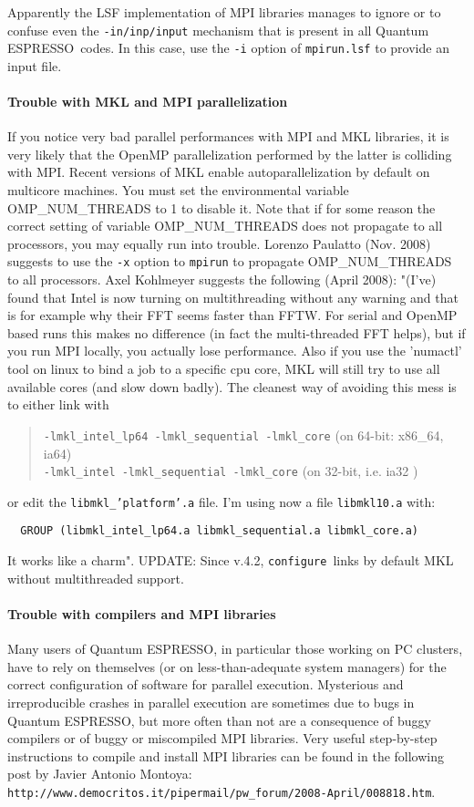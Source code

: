 \documentclass[12pt,a4paper]{article}
\def\qe{{\sc Quantum ESPRESSO}}
\def\configure{\texttt{configure}}
\begin{document}
Apparently the LSF implementation of MPI libraries manages to ignore or to
confuse even the \texttt{-in/inp/input} mechanism that is present in all
\qe\ codes. In this case, use the \texttt{-i} option of \texttt{mpirun.lsf}
to provide an input file.

\paragraph{Trouble with MKL and MPI parallelization}
If you notice very bad parallel performances with MPI and MKL libraries, 
it is very likely that the OpenMP parallelization performed by the latter 
is colliding with MPI. Recent versions of MKL enable autoparallelization
by default on multicore machines.  You must set the environmental variable
OMP\_NUM\_THREADS to 1 to disable it. 
Note that if for some reason the correct setting  of variable
OMP\_NUM\_THREADS  
does not propagate to all processors, you may equally run into trouble. 
Lorenzo Paulatto (Nov. 2008) suggests to use the \texttt{-x} option to \texttt{mpirun} to 
propagate OMP\_NUM\_THREADS to all processors.
Axel Kohlmeyer suggests the following (April 2008): 
"(I've) found that Intel is now turning on multithreading without any
warning and that is for example why their FFT seems faster than
FFTW. For serial and OpenMP based runs this makes no difference (in
fact the multi-threaded FFT helps), but if you run MPI locally, you
actually lose performance. Also if you use the 'numactl' tool on linux
to bind a job to a specific cpu core, MKL will still try to use all
available cores (and slow down badly). The cleanest way of avoiding
this mess is to either link with
\begin{quote}
\texttt{-lmkl\_intel\_lp64 -lmkl\_sequential -lmkl\_core} (on 64-bit: 
x86\_64, ia64)\\
\texttt{-lmkl\_intel -lmkl\_sequential -lmkl\_core} (on 32-bit, i.e. ia32 )
\end{quote}
or edit the \texttt{libmkl\_'platform'.a} file. I'm using now a file 
\texttt{libmkl10.a} with:
\begin{verbatim}
  GROUP (libmkl_intel_lp64.a libmkl_sequential.a libmkl_core.a)
\end{verbatim}
It works like a charm". UPDATE: Since v.4.2, \configure\ links by
default MKL without multithreaded support.

\paragraph{Trouble with compilers and MPI libraries}
Many users of \qe, in particular those working on PC clusters,
have to rely on themselves (or on less-than-adequate system managers) for 
the correct configuration of software for parallel execution. Mysterious and
irreproducible crashes in parallel execution are sometimes due to bugs
in \qe, but more often than not are a consequence of buggy
compilers or of buggy or miscompiled MPI libraries. Very useful step-by-step 
instructions to compile and install MPI libraries
can be found in the following post by Javier Antonio Montoya:\\
\texttt{http://www.democritos.it/pipermail/pw\_forum/2008-April/008818.htm}.
\end{document}
